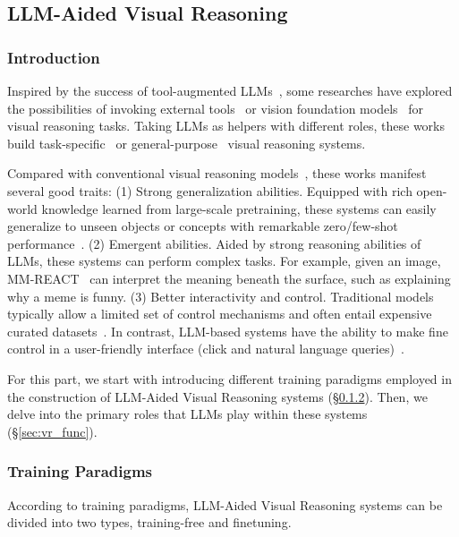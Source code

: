 \subsection{LLM-Aided Visual Reasoning}
\label{sec:vr}

\subsubsection{Introduction}
\label{sec:vr_intro}

Inspired by the success of tool-augmented LLMs~\cite{parisi2022talm, gao2022pal, schick2023toolformer, nakano2021webgpt}, some researches have explored the possibilities of invoking external tools~\cite{gpt4tools, visprog, mm-react, chameleon} or vision foundation models~\cite{mm-react, CAT, chatcaptioner, sm, visual-chatgpt, idealgpt,udandarao2022sus} for visual reasoning tasks. 
Taking LLMs as helpers with different roles, these works build task-specific~\cite{PointCLIP-V2, CaFo, CAT} or general-purpose~\cite{HuggingGPT, mm-react, visual-chatgpt, chameleon, visprog} visual reasoning systems.


Compared with conventional visual reasoning models~\cite{anderson2018bottom, yu2019deep, gao2019dynamic}, these works manifest several good traits: (1) Strong generalization abilities. Equipped with rich open-world knowledge learned from large-scale pretraining, these systems can easily generalize to unseen objects or concepts with remarkable zero/few-shot performance~\cite{chameleon, visprog, idealgpt, PointCLIP-V2, CaFo, SMs}. 
(2) Emergent abilities. Aided by strong reasoning abilities of LLMs, these systems can perform complex tasks. For example, given an image, MM-REACT~\cite{mm-react} can interpret the meaning beneath the surface, such as explaining why a meme is funny.
(3) Better interactivity and control. Traditional models typically allow a limited set of control mechanisms and often entail expensive curated datasets~\cite{gan2017stylenet, mathews2016senticap}. 
In contrast, LLM-based systems have the ability to make fine control in a user-friendly interface (\eg click and natural language queries)~\cite{CAT}.

For this part, we start with introducing different training paradigms employed in the construction of LLM-Aided Visual Reasoning systems (\S \ref{sec:vr_train}). 
Then, we delve into the primary roles that LLMs play within these systems (\S \ref{sec:vr_func}). 



\subsubsection{Training Paradigms}
\label{sec:vr_train}
According to training paradigms, LLM-Aided Visual Reasoning systems can be divided into two types, \ie training-free and finetuning.


